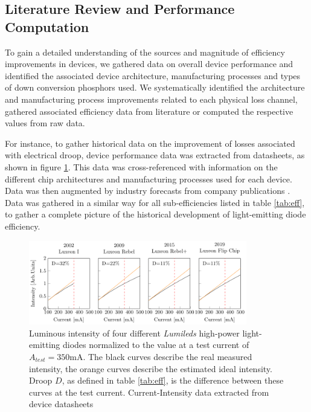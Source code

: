 \documentclass[a4paper,nocompress]{spie}  %
\begin{document}
    \subsection{Literature Review and Performance Computation}
    
        To gain a detailed understanding of the sources and magnitude of efficiency improvements in devices, we gathered data on overall device performance and identified the associated device architecture, manufacturing processes and types of down conversion phosphors used. We systematically identified the architecture and manufacturing process improvements related to each physical loss channel, gathered associated efficiency data from literature or computed the respective values from raw data.
        
        For instance, to gather historical data on the improvement of losses associated with electrical droop, device performance data was extracted from datasheets, as shown in figure \ref{fig:droop}. This data was cross-referenced with information on the different chip architectures and manufacturing processes used for each device. Data was then augmented by industry forecasts from company publications \cite{osram2014osram}. Data was gathered in a similar way for all sub-efficiencies listed in table \ref{tab:eff}, to gather a complete picture of the historical development of light-emitting diode efficiency.

        \begin{figure} [ht]
            \begin{center}
                \includegraphics[width=0.85\textwidth]{SPIE/article/droop_lumileds.pdf}
            \end{center}
            \caption{Luminous intensity of four different \textit{Lumileds} high-power light-emitting diodes normalized to the value at a test current of $A_{test}=350$mA. The black curves describe the real measured intensity, the orange curves describe the estimated ideal intensity. Droop $D$, as defined in table \ref{tab:eff}, is the difference between these curves at the test current. Current-Intensity data extracted from device datasheets \cite{datasheet_lumileds_lux1,datasheet_lumileds_rebel,datasheet_lumileds_rebplus,lumi2019data}}
            \label{fig:droop}
        \end{figure}
\end{document}
